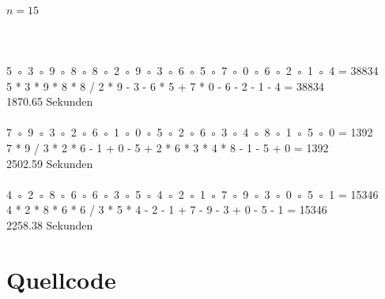 \documentclass[a4paper,10pt,ngerman]{scrartcl}
\begin{document}
\paragraph{$n=15$} \hrulefill
\\
\\
5 ◦ 3 ◦ 9 ◦ 8 ◦ 8 ◦ 2 ◦ 9 ◦ 3 ◦ 6 ◦ 5 ◦ 7 ◦ 0 ◦ 6 ◦ 2 ◦ 1 ◦ 4 = 38834\\
5 * 3 * 9 * 8 * 8 / 2 * 9 - 3 - 6 * 5 + 7 * 0 - 6 - 2 - 1 - 4 = 38834\\
1870.65 Sekunden\\
\\
7 ◦ 9 ◦ 3 ◦ 2 ◦ 6 ◦ 1 ◦ 0 ◦ 5 ◦ 2 ◦ 6 ◦ 3 ◦ 4 ◦ 8 ◦ 1 ◦ 5 ◦ 0 = 1392\\
7 * 9 / 3 * 2 * 6 - 1 + 0 - 5 + 2 * 6 * 3 * 4 * 8 - 1 - 5 + 0 = 1392\\
2502.59 Sekunden\\
\\
4 ◦ 2 ◦ 8 ◦ 6 ◦ 6 ◦ 3 ◦ 5 ◦ 4 ◦ 2 ◦ 1 ◦ 7 ◦ 9 ◦ 3 ◦ 0 ◦ 5 ◦ 1 = 15346\\
4 * 2 * 8 * 6 * 6 / 3 * 5 * 4 - 2 - 1 + 7 - 9 - 3 + 0 - 5 - 1 = 15346\\
2258.38 Sekunden\\



\section{Quellcode}
\end{document}
